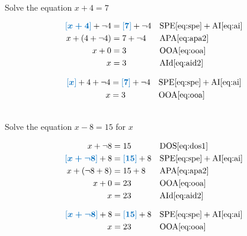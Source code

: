 \documentclass[20150903-160354-rs2.2-MarksMathNotebook.tex]{subfiles}
\begin{document}
\begin{example}[id:20141206-101632] \label{20141206-101632} \hfill \\

Solve the equation $x+4=7$

\soln

\solnsteps
\begin{align*}
\farg{x +4} + \neg 4  &= \farg{7} + \neg 4  && \text{SPE} \eqref{eq:spe} + \text{AI} \eqref{eq:ai} \\
x + (4+\neg 4) &= 7 + \neg 4  && \text{APA} \eqref{eq:apa2} \\
x + 0 &= 3  && \text{OOA} \eqref{eq:ooa} \\
x  &= 3  && \text{AId} \eqref{eq:aid2}
\end{align*}

\soln

\lesssteps

\begin{align*}
\farg{x} +4 + \neg 4  &= \farg{7} + \neg 4  && \text{SPE} \eqref{eq:spe} + \text{AI} \eqref{eq:ai} \\
x &= 3  && \text{OOA} \eqref{eq:ooa}
\end{align*}
\end{example}

\begin{example}[id:20141206-101107] \label{20141206-101107} \hfill \\

Solve the equation $x-8=15$ for $x$

\soln

\solnsteps
\begin{align*}
x+ \neg 8 &= 15  && \text{DOS} \eqref{eq:dos1} \\
\farg{x+ \neg 8} + 8  &= \farg{15} + 8  && \text{SPE} \eqref{eq:spe} + \text{AI} \eqref{eq:ai} \\
x + (\neg 8+ 8) &= 15 + 8  && \text{APA} \eqref{eq:apa2} \\
x + 0 &= 23  && \text{OOA} \eqref{eq:ooa} \\
x  &= 23  && \text{AId} \eqref{eq:aid2}
\end{align*}

\soln

\lesssteps
\begin{align*}
\farg{x+ \neg 8} + 8  &= \farg{15} + 8  && \text{SPE} \eqref{eq:spe} + \text{AI} \eqref{eq:ai} \\
x &= 23  && \text{OOA} \eqref{eq:ooa} \\
\end{align*}
\end{example}
\end{document}
